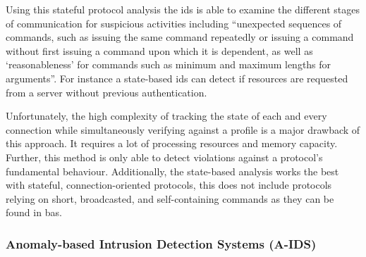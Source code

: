 Using this stateful protocol analysis the \gls{ids} is able to examine the different stages of communication for suspicious activities including \enquote{unexpected sequences of commands, such as issuing the same command repeatedly or issuing a command without first issuing a command upon which it is dependent, as well as \enquote{reasonableness} for commands such as minimum and maximum lengths for arguments}. \parencite{Scarfone2007}
For instance a state-based \gls{ids} can detect if resources are requested from a server without previous authentication. \parencite[p.~306]{Whitman2009}

Unfortunately, the high complexity of tracking the state of each and every connection while simultaneously verifying against a profile is a major drawback of this approach. It requires a lot of processing resources and memory capacity.
Further, this method is only able to detect violations against a protocol's fundamental behaviour.
Additionally, the state-based analysis works the best with stateful, connection-oriented protocols, this does not include protocols relying on short, broadcasted, and self-containing commands as they can be found in \gls{bas}. \parencite[p.~306]{Whitman2009}

\subsubsection{Anomaly-based Intrusion Detection Systems (A-IDS)}
\label{sec:background:network:ids:anomaly}
	
